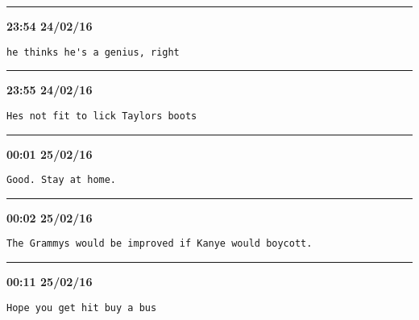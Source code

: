 \hrule%

\begin{adjustwidth}{0cm}{0cm}
\footnotesize \textbf{23:54 24/02/16}

\begin{lstlisting}[breaklines, breakatwhitespace, basicstyle=\small, frame=leftline]
he thinks he's a genius, right
\end{lstlisting}
\end{adjustwidth}

\hrule%

\begin{adjustwidth}{0cm}{0cm}
\footnotesize \textbf{23:55 24/02/16}

\begin{lstlisting}[breaklines, breakatwhitespace, basicstyle=\small, frame=leftline]
Hes not fit to lick Taylors boots
\end{lstlisting}
\end{adjustwidth}

\hrule%

\begin{adjustwidth}{0cm}{0cm}
\footnotesize \textbf{00:01 25/02/16}

\begin{lstlisting}[breaklines, breakatwhitespace, basicstyle=\small, frame=leftline]
Good. Stay at home.
\end{lstlisting}
\end{adjustwidth}

\hrule%

\begin{adjustwidth}{0cm}{0cm}
\footnotesize \textbf{00:02 25/02/16}

\begin{lstlisting}[breaklines, breakatwhitespace, basicstyle=\small, frame=leftline]
The Grammys would be improved if Kanye would boycott.
\end{lstlisting}
\end{adjustwidth}

\hrule%

\begin{adjustwidth}{0cm}{0cm}
\footnotesize \textbf{00:11 25/02/16}

\begin{lstlisting}[breaklines, breakatwhitespace, basicstyle=\small, frame=leftline]
Hope you get hit buy a bus
\end{lstlisting}
\end{adjustwidth}

